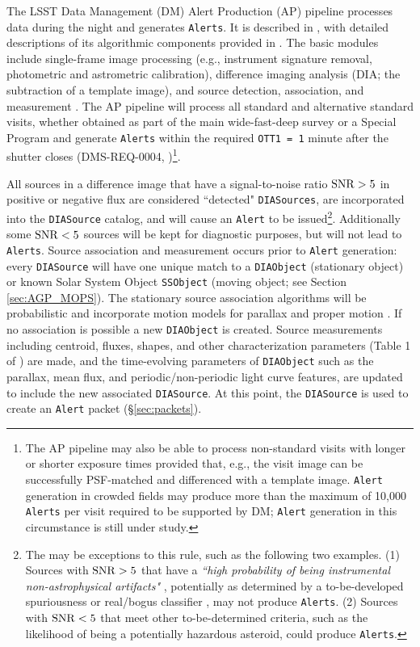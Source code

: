 The LSST Data Management (DM) Alert Production (AP) pipeline processes data during the night and generates {\tt Alerts}.
It is described in , with detailed descriptions of its algorithmic components provided in .
The basic modules include single-frame image processing (e.g., instrument signature removal, photometric and astrometric calibration), difference imaging analysis (DIA; the subtraction of a template image), and source detection, association, and measurement .
The AP pipeline will process all standard and alternative standard visits, whether obtained as part of the main wide-fast-deep survey or a Special Program  and generate {\tt Alerts} within the required {\tt OTT1 = 1} minute after the shutter closes (DMS-REQ-0004, )\footnote{
The AP pipeline may also be able to process non-standard visits with longer or shorter exposure times provided that, e.g., the visit image can be successfully PSF-matched and differenced with a template image.
\texttt{Alert} generation in crowded fields may produce more than the maximum of 10,000 \texttt{Alerts} per visit required to be supported by DM; \texttt{Alert} generation in this circumstance is still under study.
}.

All sources in a difference image that have a signal-to-noise ratio ${\rm SNR}>5$ in positive or negative flux are considered ``detected" \texttt{DIASources}, are incorporated into the {\tt DIASource} catalog, and will cause an {\tt Alert} to be issued\footnote{
The may be exceptions to this rule, such as the following two examples.
(1) Sources with ${\rm SNR} > 5$ that have a {\it ``high probability of being instrumental non-astrophysical artifacts"} , potentially as determined by 
a to-be-developed spuriousness or real/bogus classifier , may not produce \texttt{Alerts}.
(2) Sources with ${\rm SNR} < 5$ that meet other to-be-determined criteria, such as the likelihood of being a potentially hazardous asteroid, could produce \texttt{Alerts}.
}.
Additionally some ${\rm SNR} < 5$ sources will be kept for diagnostic purposes, but will not lead to {\tt Alerts}.
Source association and measurement occurs prior to {\tt Alert} generation: every {\tt DIASource} will have one unique match to a {\tt DIAObject} (stationary object) or known Solar System Object {\tt SSObject} (moving object; see Section \ref{sec:AGP_MOPS}).
The stationary source association algorithms will be probabilistic and incorporate motion models for parallax and proper motion .
If no association is possible a new {\tt DIAObject} is created.
Source measurements including centroid, fluxes, shapes, and other characterization parameters (Table 1 of ) are made, and the time-evolving parameters of {\tt DIAObject} such as the parallax, mean flux, and periodic/non-periodic light curve features, are updated to include the new associated {\tt DIASource}.
At this point, the {\tt DIASource} is used to create an {\tt Alert} packet (\S \ref{sec:packets}).

